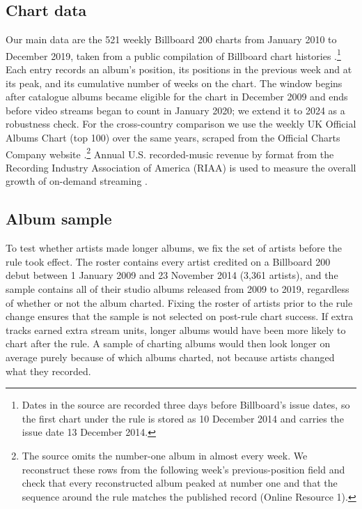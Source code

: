 \documentclass[pdflatex,sn-apa]{sn-jnl}
\begin{document}
\subsection{Chart data}\label{subsec:chartdata}
Our main data are the 521 weekly Billboard 200 charts from January 2010 to December 2019, taken from a public compilation of Billboard chart histories \citep{kaggle_billboard}.\footnote{Dates in the source are recorded three days before Billboard's issue dates, so the first chart under the rule is stored as 10 December 2014 and carries the issue date 13 December 2014.} Each entry records an album's position, its positions in the previous week and at its peak, and its cumulative number of weeks on the chart. The window begins after catalogue albums became eligible for the chart in December 2009 \citep{billboard2009makeover} and ends before video streams began to count in January 2020; we extend it to 2024 as a robustness check. For the cross-country comparison we use the weekly UK Official Albums Chart (top 100) over the same years, scraped from the Official Charts Company website \citep{uktop100scrape}.\footnote{The source omits the number-one album in almost every week. We reconstruct these rows from the following week's previous-position field and check that every reconstructed album peaked at number one and that the sequence around the rule matches the published record (Online Resource 1).} Annual U.S. recorded-music revenue by format from the Recording Industry Association of America (RIAA) is used to measure the overall growth of on-demand streaming \citep{riaa_sales_database}.

\subsection{Album sample}\label{subsec:albums}
To test whether artists made longer albums, we fix the set of artists before the rule took effect. The roster contains every artist credited on a Billboard 200 debut between 1 January 2009 and 23 November 2014 (3,361 artists), and the sample contains all of their studio albums released from 2009 to 2019, regardless of whether or not the album charted. Fixing the roster of artists prior to the rule change ensures that the sample is not selected on post-rule chart success. If extra tracks earned extra stream units, longer albums would have been more likely to chart after the rule. A sample of charting albums would then look longer on average purely because of which albums charted, not because artists changed what they recorded.
\end{document}
